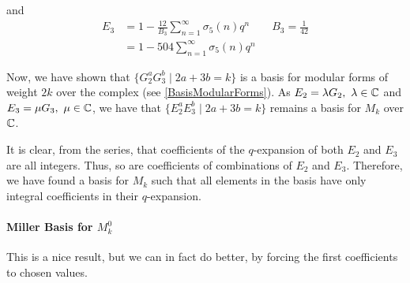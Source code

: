 and
\begin{align*}
	E_3 &= 1 - \frac{12}{B_3} \sum_{n=1}^{\infty} \sigma_{5}(n)q^n \qquad B_3 = \frac{1}{42} \\
	    &= 1 - 504 \sum_{n=1}^{\infty} \sigma_{5}(n)q^n
\end{align*}

Now, we have shown that $\{G_2^aG_3^b \mid 2a+3b=k\}$ is a basis for modular forms of weight $2k$ over the complex (see \ref{BasisModularForms}).
As $E_2 = \lambda G_2,\ \lambda \in \mathbb{C}$ and $E_3 = \mu G_3,\ \mu \in \mathbb{C}$, we have that $\{E_2^aE_3^b \mid 2a+3b=k\}$ remains a basis for $M_k$ over $\mathbb{C}$.

It is clear, from the series, that coefficients of the $q$-expansion of both $E_2$ and $E_3$ are all integers.
Thus, so are coefficients of combinations of $E_2$ and $E_3$.
Therefore, we have found a basis for $M_k$ such that all elements in the basis have only integral coefficients in their $q$-expansion.
\label{IntegralBasisModularForms}

\paragraph{Miller Basis for $M_k^0$}
This is a nice result, but we can in fact do better, by forcing the first coefficients to chosen values.

